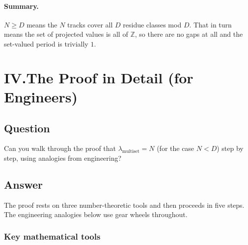 \documentclass{amsart}
\theoremstyle{definition}
\theoremstyle{plain}
\theoremstyle{remark}
\begin{document}
\paragraph{Summary.}
\(N \ge D\) means the \(N\) tracks cover all \(D\) residue classes mod \(D\).
That in turn means the set of projected values is all of \(\mathbb{Z}\), so
there are no gaps at all and the set-valued period is trivially \(1\).

\section*{IV.\enspace The Proof in Detail (for Engineers)}

\subsection*{Question}

Can you walk through the proof that \(\lambda_{\mathrm{multiset}} = N\) (for the
case \(N < D\)) step by step, using analogies from engineering?

\subsection*{Answer}

The proof rests on three number-theoretic tools and then proceeds in five
steps.  The engineering analogies below use gear wheels throughout.

\subsubsection*{Key mathematical tools}
\end{document}
